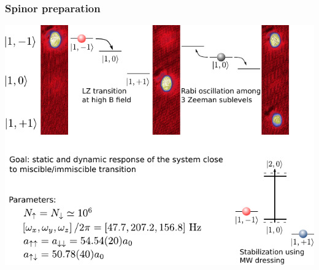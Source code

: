\begin{frame}
\frametitle{Spinor preparation}


\centering
\includegraphics[width=0.9\linewidth]{Figures/Spinor_Preparation.pdf}


\end{frame}

